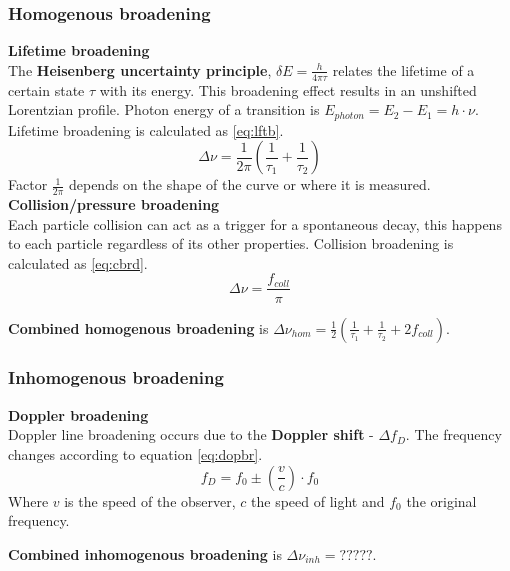 \subsubsection{Homogenous broadening}
\textbf{Lifetime broadening}\\
The \textbf{Heisenberg uncertainty principle}, $\delta E = \frac{h}{4 \pi \tau}$ relates the lifetime of a certain state $\tau$
with its energy. This broadening effect results in an unshifted Lorentzian profile.
Photon energy of a transition is $E_{photon} = E_2 - E_1 = h \cdot \nu$.
Lifetime broadening is calculated as \ref{eq:lftb}.
\begin{equation}
    \Delta \nu = \frac{1}{2 \pi} (\frac{1}{\tau_1} + \frac{1}{\tau_2})
    \label{eq:lftb}
\end{equation}
Factor $\frac{1}{2 \pi}$ depends on the shape of the curve or where it is measured.\\

\textbf{Collision/pressure broadening}\\
Each particle collision can act as a trigger for a spontaneous decay, this happens to each particle regardless of its other
properties. Collision broadening is calculated as \ref{eq:cbrd}.
\begin{equation}
    \Delta \nu = \frac{f_{coll}}{\pi}
    \label{eq:cbrd}
\end{equation}

\textbf{Combined homogenous broadening} is $\Delta \nu_{hom} = \frac{1}{2}(\frac{1}{\tau_1} + \frac{1}{\tau_2} + 2 f_{coll})$.

\subsubsection{Inhomogenous broadening}
\textbf{Doppler broadening}\\
Doppler line broadening occurs due to the \textbf{Doppler shift} - $\Delta f_D$. The frequency changes according to equation \ref{eq:dopbr}.
\begin{equation}
    f_D = f_0 \pm (\frac{v}{c})\cdot f_0
    \label{eq:dopbr}
\end{equation}
Where $v$ is the speed of the observer, $c$ the speed of light and $f_0$ the original frequency.

\textbf{Combined inhomogenous broadening} is $\Delta \nu_{inh} = ?????$.